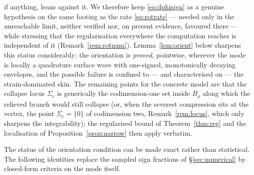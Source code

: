 if anything, leans against it. We therefore keep \eqref{eq:dphisign} as a genuine hypothesis on the same footing as the
rate \eqref{eq:rotrate} --- needed only in the unreachable limit, neither verified nor, on present evidence, favoured
there --- while stressing that the regularisation everywhere the computation reaches is independent of it
(Remark~\ref{rem:rotnum}). Lemma~\ref{lem:orient} below sharpens this status considerably: the orientation is
\emph{proved}, pointwise, wherever the mode is locally a quadrature surface wave with one-signed, monotonically
decaying envelopes, and the possible failure is confined to --- and characterised on --- the strain-dominated skin. The remaining
points for the concrete model are that the collapse locus $\Sigma_{\mathrm{c}}$ is
generically the
codimension-one set inside $B_\rho$ along which the relieved branch would still collapse (or, when the severest
compression sits at the vertex, the point $\Sigma_{\mathrm{c}}=\{0\}$ of codimension two, Remark~\ref{rem:locus}, which
only sharpens the integrability); the regularised bound of
Theorem~\ref{thm:reg} and the localisation of Proposition~\ref{prop:narrow} then apply verbatim.

The status of the orientation condition can be made exact rather than statistical. The following identities replace
the sampled sign fractions of \S\ref{sec:numerical} by closed-form criteria on the mode itself.

